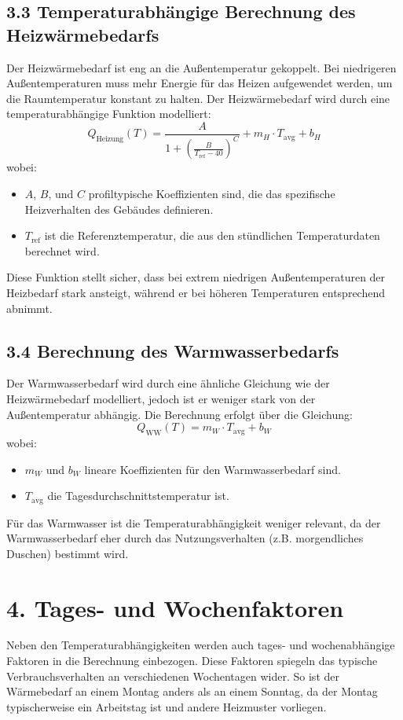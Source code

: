 \documentclass{article}
\begin{document}
\subsection*{3.3 Temperaturabhängige Berechnung des Heizwärmebedarfs}
Der Heizwärmebedarf ist eng an die Außentemperatur gekoppelt. Bei niedrigeren Außentemperaturen muss mehr Energie für das Heizen aufgewendet werden, um die Raumtemperatur konstant zu halten. Der Heizwärmebedarf wird durch eine temperaturabhängige Funktion modelliert:
\[
Q_{\text{Heizung}}(T) = \frac{A}{1 + \left( \frac{B}{T_{\text{ref}} - 40} \right)^C} + m_H \cdot T_{\text{avg}} + b_H
\]
wobei:
\begin{itemize}
    \item \( A \), \( B \), und \( C \) profiltypische Koeffizienten sind, die das spezifische Heizverhalten des Gebäudes definieren.
    \item \( T_{\text{ref}} \) ist die Referenztemperatur, die aus den stündlichen Temperaturdaten berechnet wird.
\end{itemize}

Diese Funktion stellt sicher, dass bei extrem niedrigen Außentemperaturen der Heizbedarf stark ansteigt, während er bei höheren Temperaturen entsprechend abnimmt.

\subsection*{3.4 Berechnung des Warmwasserbedarfs}
Der Warmwasserbedarf wird durch eine ähnliche Gleichung wie der Heizwärmebedarf modelliert, jedoch ist er weniger stark von der Außentemperatur abhängig. Die Berechnung erfolgt über die Gleichung:
\[
Q_{\text{WW}}(T) = m_W \cdot T_{\text{avg}} + b_W
\]
wobei:
\begin{itemize}
    \item \( m_W \) und \( b_W \) lineare Koeffizienten für den Warmwasserbedarf sind.
    \item \( T_{\text{avg}} \) die Tagesdurchschnittstemperatur ist.
\end{itemize}
Für das Warmwasser ist die Temperaturabhängigkeit weniger relevant, da der Warmwasserbedarf eher durch das Nutzungsverhalten (z.B. morgendliches Duschen) bestimmt wird.

\section*{4. Tages- und Wochenfaktoren}
Neben den Temperaturabhängigkeiten werden auch tages- und wochenabhängige Faktoren in die Berechnung einbezogen. Diese Faktoren spiegeln das typische Verbrauchsverhalten an verschiedenen Wochentagen wider. So ist der Wärmebedarf an einem Montag anders als an einem Sonntag, da der Montag typischerweise ein Arbeitstag ist und andere Heizmuster vorliegen.
\end{document}
